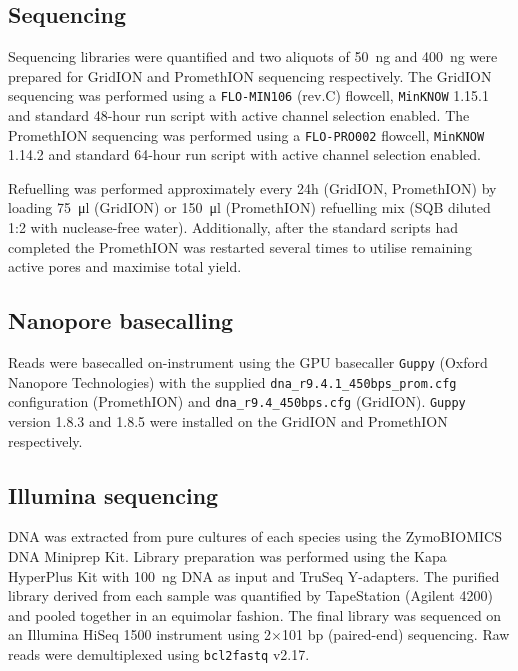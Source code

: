 \documentclass[a4paper,num-refs]{oup-contemporary}
\begin{document}
\subsection{Sequencing}

Sequencing libraries were quantified and two aliquots of \SI{50}{\nano\gram} and \SI{400}{\nano\gram} were prepared for GridION and PromethION sequencing respectively. The GridION sequencing was performed using a \texttt{FLO-MIN106} (rev.C) flowcell, \texttt{MinKNOW} 1.15.1 and standard 48-hour run script with active channel selection enabled. The PromethION sequencing was performed using a \texttt{FLO-PRO002} flowcell, \texttt{MinKNOW} 1.14.2 and standard 64-hour run script with active channel selection enabled.

Refuelling was performed approximately every 24h (GridION, PromethION) by loading \SI{75}{\micro\litre} (GridION) or \SI{150}{\micro\litre} (PromethION) refuelling mix (SQB diluted 1:2 with nuclease-free water). Additionally, after the standard scripts had completed the PromethION was restarted several times to utilise remaining active pores and maximise total yield.

\subsection{Nanopore basecalling}
Reads were basecalled on-instrument using the GPU basecaller \texttt{Guppy} (Oxford Nanopore Technologies) with the supplied \texttt{dna\_r9.4.1\_450bps\_prom.cfg} configuration (PromethION) and \texttt{dna\_r9.4\_450bps.cfg} (GridION). \texttt{Guppy} version 1.8.3 and 1.8.5 were installed on the GridION and PromethION respectively.

\subsection{Illumina sequencing}

DNA was extracted from pure cultures of each species using the ZymoBIOMICS DNA Miniprep Kit. Library preparation was performed using the Kapa HyperPlus Kit with \SI{100}{\nano\gram} DNA as input and TruSeq Y-adapters. The purified library derived from each sample was quantified by TapeStation (Agilent 4200) and pooled together in an equimolar fashion. The final library was sequenced on an Illumina HiSeq 1500 instrument using 2$\times$101 bp (paired-end) sequencing. Raw reads were demultiplexed using \texttt{bcl2fastq} v2.17.
\end{document}
